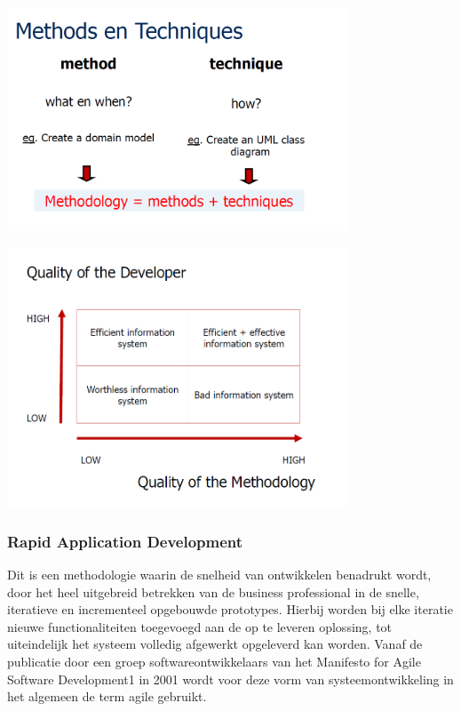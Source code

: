 \begin{center}
\includegraphics[width=4in]{img/methodstechniques}%
\label{labelname}%
\end{center}




\begin{center}
\includegraphics[width=4in]{img/quality}%
\label{quality}%
\end{center}

\subsubsection{Rapid Application Development}

Dit is een methodologie waarin de snelheid van ontwikkelen benadrukt wordt, door het heel uitgebreid betrekken van de business professional in de snelle, iteratieve en incrementeel opgebouwde prototypes. Hierbij worden bij elke iteratie nieuwe functionaliteiten toegevoegd aan de op te leveren oplossing, tot uiteindelijk het systeem volledig afgewerkt opgeleverd kan worden.
Vanaf de publicatie door een groep softwareontwikkelaars van het Manifesto for Agile Software Development1 in 2001 wordt voor deze vorm van systeemontwikkeling in het algemeen de term agile gebruikt.

